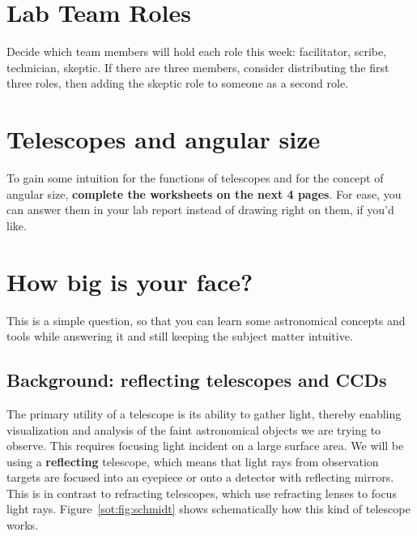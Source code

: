 \section{Lab Team Roles}

Decide which team members will hold each role this week: facilitator, scribe, technician, skeptic. If there are three members, consider distributing the first three roles, then adding the skeptic role to someone as a second role.

\section{Telescopes and angular size}

To gain some intuition for the functions of telescopes and for the concept of angular size, \textbf{complete the worksheets on the next 4 pages}. For ease, you can answer them in your lab report instead of drawing right on them, if you'd like.



\section{How big is your face?}

This is a simple question, so that you can learn some astronomical concepts and tools while answering it and still keeping the subject matter intuitive.

\subsection{Background: reflecting telescopes and CCDs}

The primary utility of a telescope is its ability to gather light, thereby enabling visualization and analysis of the faint astronomical objects we are trying to observe. This requires focusing light incident on a large surface area. We will be using a \textbf{reflecting} telescope, which means that light rays from observation targets are focused into an eyepiece or onto a detector with reflecting mirrors. This is in contrast to refracting telescopes, which use refracting lenses to focus light rays. Figure~\ref{sot:fig:schmidt} shows schematically how this kind of telescope works. 

